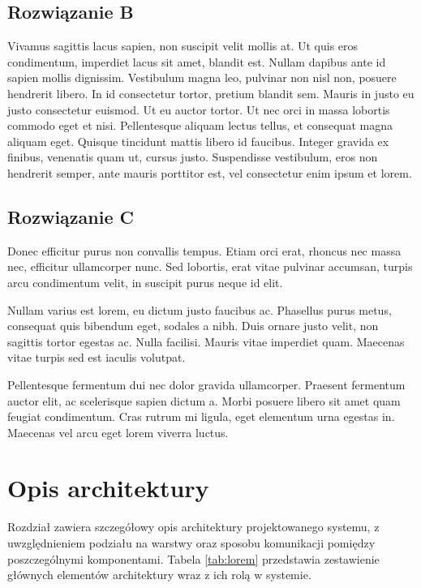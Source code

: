 \documentclass[times]{san}
\begin{document}
\subsection{Rozwiązanie B}
Vivamus sagittis lacus sapien, non suscipit velit mollis at. Ut quis eros condimentum, imperdiet lacus sit amet, blandit est. Nullam dapibus ante id sapien mollis dignissim. Vestibulum magna leo, pulvinar non nisl non, posuere hendrerit libero. In id consectetur tortor, pretium blandit sem. Mauris in justo eu justo consectetur euismod. Ut eu auctor tortor. Ut nec orci in massa lobortis commodo eget et nisi. Pellentesque aliquam lectus tellus, et consequat magna aliquam eget. Quisque tincidunt mattis libero id faucibus. Integer gravida ex finibus, venenatis quam ut, cursus justo. Suspendisse vestibulum, eros non hendrerit semper, ante mauris porttitor est, vel consectetur enim ipsum et lorem.

\subsection{Rozwiązanie C}
Donec efficitur purus non convallis tempus. Etiam orci erat, rhoncus nec massa nec, efficitur ullamcorper nunc. Sed lobortis, erat vitae pulvinar accumsan, turpis arcu condimentum velit, in suscipit purus neque id elit. 

Nullam varius est lorem, eu dictum justo faucibus ac. Phasellus purus metus, consequat quis bibendum eget, sodales a nibh. Duis ornare justo velit, non sagittis tortor egestas ac. Nulla facilisi. Mauris vitae imperdiet quam. Maecenas vitae turpis sed est iaculis volutpat. 

Pellentesque fermentum dui nec dolor gravida ullamcorper. Praesent fermentum auctor elit, ac scelerisque sapien dictum a. Morbi posuere libero sit amet quam feugiat condimentum. Cras rutrum mi ligula, eget elementum urna egestas in. Maecenas vel arcu eget lorem viverra luctus.



\section{Opis architektury}

Rozdział zawiera szczegółowy opis architektury projektowanego systemu,
z uwzględnieniem podziału na warstwy oraz sposobu komunikacji pomiędzy
poszczególnymi komponentami. Tabela \ref{tab:lorem} przedstawia zestawienie
głównych elementów architektury wraz z ich rolą w systemie.
\end{document}
